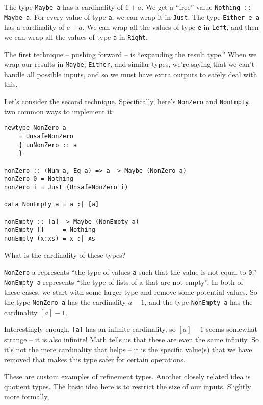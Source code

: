 The type \texttt{Maybe a} has a cardinality of $1 + a$. We get a ``free'' value \texttt{Nothing :: Maybe a}. For every value of type \texttt{a}, we can wrap it in \texttt{Just}. 
The type \texttt{Either e a} has a cardinality of $e + a$. We can wrap all the values of type \texttt{e} in \texttt{Left}, and then we can wrap all the values of type \texttt{a} in \texttt{Right}.

The first technique -- pushing forward -- is ``expanding the result type.'' When we wrap our results in \texttt{Maybe}, \texttt{Either}, and similar types, we're saying that we can't handle all possible inputs, and so we must have extra outputs to safely deal with this.

Let's consider the second technique. Specifically, here's \texttt{NonZero} and \texttt{NonEmpty}, two common ways to implement it:

\begin{verbatim}
newtype NonZero a
    = UnsafeNonZero
    { unNonZero :: a
    }

nonZero :: (Num a, Eq a) => a -> Maybe (NonZero a)
nonZero 0 = Nothing
nonZero i = Just (UnsafeNonZero i)

data NonEmpty a = a :| [a]

nonEmpty :: [a] -> Maybe (NonEmpty a)
nonEmpty []     = Nothing
nonEmpty (x:xs) = x :| xs
\end{verbatim}
What is the cardinality of these types?

\texttt{NonZero} a represents ``the type of values \texttt{a} such that the value is not equal to \texttt{0}.'' \texttt{NonEmpty a} represents ``the type of lists of a that are not empty''. In both of these cases, we start with some larger type and remove some potential values. So the type \texttt{NonZero a} has the cardinality $a - 1$, and the type \texttt{NonEmpty a} has the cardinality $[a] - 1$.

Interestingly enough, \texttt{[a]} has an infinite cardinality, so $[a] - 1$ seems somewhat strange -- it is also infinite! Math tells us that these are even the same infinity. So it's not the mere cardinality that helps -- it is the specific value(s) that we have removed that makes this type safer for certain operations.

These are custom examples of \href{https://ucsd-progsys.github.io/liquidhaskell-tutorial/}{refinement types}. Another closely related idea is \href{https://www.hedonisticlearning.com/posts/quotient-types-for-programmers.html}{quotient types}. The basic idea here is to restrict the size of our inputs. Slightly more formally,

